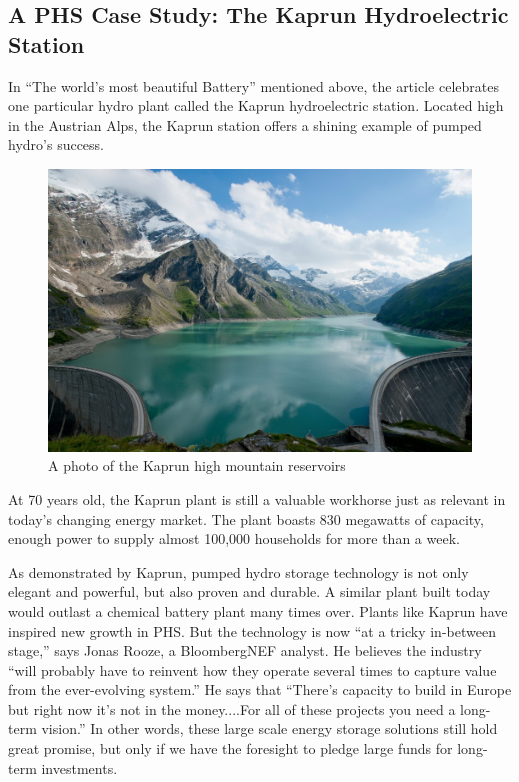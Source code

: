 \documentclass[hidelinks,12pt,a4paper]{article}
\begin{document}
\subsection{A PHS Case Study: The Kaprun Hydroelectric Station}
In “The world's most beautiful Battery” mentioned above, the article celebrates one particular hydro plant called the Kaprun hydroelectric station. Located high in the Austrian Alps, the Kaprun station offers a shining example of pumped hydro's success.


\begin{figure}[ht!]
    \centering
    \includegraphics[width=1\textwidth]{kaprun-hydroelectric-station-photo.jpeg}
    \caption{A photo of the Kaprun high mountain reservoirs \cite{MostBeautifulBattery}}
\end{figure}
\FloatBarrier

At 70 years old, the Kaprun plant is still a valuable workhorse just as relevant in today's changing energy market. The plant boasts 830 megawatts of capacity, enough power to supply almost 100,000 households for more than a week. \cite{MostBeautifulBattery}

As demonstrated by Kaprun, pumped hydro storage technology is not only elegant and powerful, but also proven and durable. A similar plant built today would outlast a chemical battery plant many times over. Plants like Kaprun have inspired new growth in PHS. But the technology is now “at a tricky in-between stage,” says Jonas Rooze, a BloombergNEF analyst. \cite{MostBeautifulBattery} He believes the industry “will probably have to reinvent how they operate several times to capture value from the ever-evolving system.” \cite{MostBeautifulBattery} He says that “There’s capacity to build in Europe but right now it’s not in the money....For all of these projects you need a long-term vision.” \cite{MostBeautifulBattery} In other words, these large scale energy storage solutions still hold great promise, but only if we have the foresight to pledge large funds for long-term investments.
\end{document}
